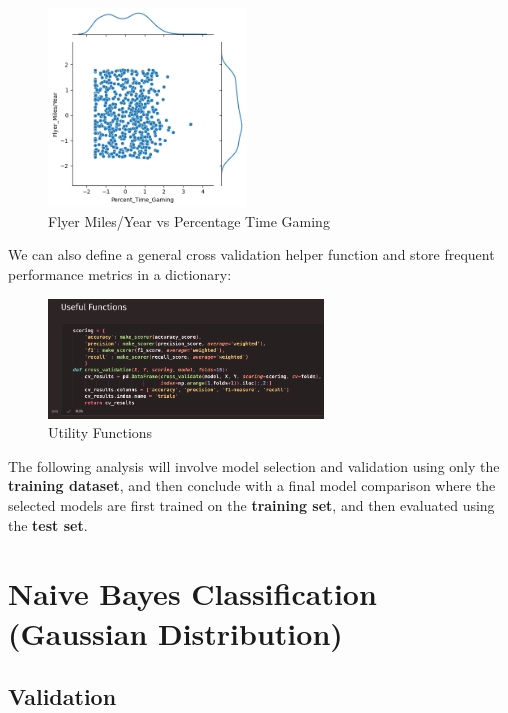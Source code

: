 \documentclass{article}
\begin{document}
    \begin{figure}[H]
        \centering
        \includegraphics[width=0.47\textwidth, height=0.3\textheight]{pre_d.png}
        \caption{\small{Flyer Miles/Year vs Percentage Time Gaming}}
    \end{figure}

    We can also define a general cross validation helper function and store frequent performance
    metrics in a dictionary:

    \begin{figure}[H]
        \centering
        \includegraphics[width=0.65\textwidth, height=0.22\textheight]{helper.png}
        \caption{\small{Utility Functions}}
    \end{figure}

    The following analysis will involve model selection and validation using only
    the \textbf{training dataset}, and then conclude with a final model comparison
    where the selected models are first trained on the \textbf{training set}, and then
    evaluated using the \textbf{test set}.

    \newpage

\section*{Naive Bayes Classification (Gaussian Distribution)}

    \subsection*{Validation}
\end{document}
